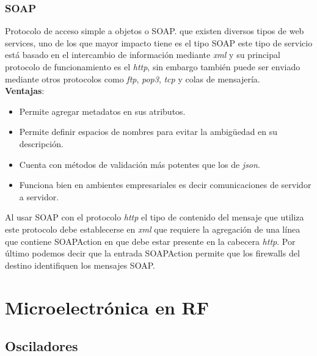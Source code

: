 \documentclass[
	12pt, %
	fleqn, %
	a4paper, %
	oneside, %
]{LegrandOrangeBook}
\begin{document}
\section{SOAP}
Protocolo de acceso simple a objetos o SOAP. 
que existen diversos tipos de web
services, uno de los que mayor impacto tiene es el tipo SOAP este tipo de servicio está basado en el intercambio de información mediante \textit{xml} y su principal protocolo de funcionamiento es el \textit{http}, sin embargo también puede ser enviado mediante otros protocolos como \textit{ftp}, \textit{pop3}, \textit{tcp} y colas de mensajería. \\
\textbf{Ventajas}:
\begin{itemize}
\item Permite agregar metadatos en sus atributos.
\item Permite definir espacios de nombres para evitar la ambigüedad en su descripción.
\item Cuenta con métodos de validación más potentes que los de \textit{json}.
\item Funciona bien en ambientes empresariales es decir comunicaciones de servidor a servidor.
\end{itemize}
Al usar SOAP con el protocolo \textit{http} el tipo de contenido del mensaje que utiliza este protocolo debe establecerse en \textit{xml} que requiere la agregación de una línea que contiene SOAPAction en que debe estar presente en la cabecera \textit{http}. Por último podemos decir que la entrada SOAPAction permite que los firewalls del destino identifiquen los mensajes SOAP.
\part{Microelectrónica en RF}
\chapter{Osciladores}
\end{document}
